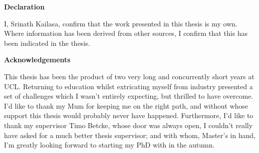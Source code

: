\thispagestyle{plain}

\begin{center}
    \textbf{Declaration}
\end{center}
I, Srinath Kailasa, confirm that the work presented in this thesis is my own. Where information has been derived from other
sources, I confirm that this has been indicated in the thesis.


\begin{center}
    \textbf{Acknowledgements}
\end{center}

This thesis has been the product of two very long and concurrently short years
at UCL. Returning to education whilst extricating myself from industry presented a set
of challenges which I wasn't entirely expecting, but thrilled to have overcome. I'd
like to thank my Mum for keeping me on the right path, and without whose support
this thesis would probably never have happened. Furthermore, I'd like to thank my
supervisor Timo Betcke, whose door was always open, I couldn't really have asked
for a much better thesis supervisor; and with whom, Master's in hand, I'm greatly
looking forward to starting my PhD with in the autumn.
